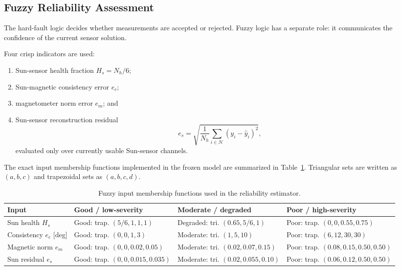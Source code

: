 \documentclass[11pt,a4paper]{article}
\begin{document}
\subsection{Fuzzy Reliability Assessment}

The hard-fault logic decides whether measurements are accepted or rejected. Fuzzy logic has a separate role: it communicates the confidence of the current sensor solution.

Four crisp indicators are used:
\begin{enumerate}
    \item Sun-sensor health fraction $H_s=N_h/6$;
    \item Sun-magnetic consistency error $e_c$;
    \item magnetometer norm error $e_m$; and
    \item Sun-sensor reconstruction residual
    \begin{equation}
        e_s=
        \sqrt{\frac{1}{N_h}
        \sum_{i\in\mathcal{H}}
        \left(y_i-\hat y_i\right)^2},
    \end{equation}
    evaluated only over currently usable Sun-sensor channels.
\end{enumerate}

The exact input membership functions implemented in the frozen model are summarized in Table~\ref{tab:fuzzy-membership}. Triangular sets are written as $(a,b,c)$ and trapezoidal sets as $(a,b,c,d)$.

\begin{table}[H]
\centering
\caption{Fuzzy input membership functions used in the reliability estimator.}
\label{tab:fuzzy-membership}
\scriptsize
\renewcommand{\arraystretch}{1.15}
\setlength{\tabcolsep}{3.5pt}
\begin{tabularx}{\textwidth}{|p{2.7cm}|X|X|X|}
\hline
\textbf{Input} & \textbf{Good / low-severity} & \textbf{Moderate / degraded} & \textbf{Poor / high-severity} \\
\hline
Sun health $H_s$ & Good: trap. $(5/6,1,1,1)$ & Degraded: tri. $(0.65,5/6,1)$ & Poor: trap. $(0,0,0.55,0.75)$ \\
\hline
Consistency $e_c$ [deg] & Good: trap. $(0,0,1,3)$ & Moderate: tri. $(1,5,10)$ & Poor: trap. $(6,12,30,30)$ \\
\hline
Magnetic norm $e_m$ & Good: trap. $(0,0,0.02,0.05)$ & Moderate: tri. $(0.02,0.07,0.15)$ & Poor: trap. $(0.08,0.15,0.50,0.50)$ \\
\hline
Sun residual $e_s$ & Good: trap. $(0,0,0.015,0.035)$ & Moderate: tri. $(0.02,0.055,0.10)$ & Poor: trap. $(0.06,0.12,0.50,0.50)$ \\
\hline
\end{tabularx}
\end{table}
\end{document}
